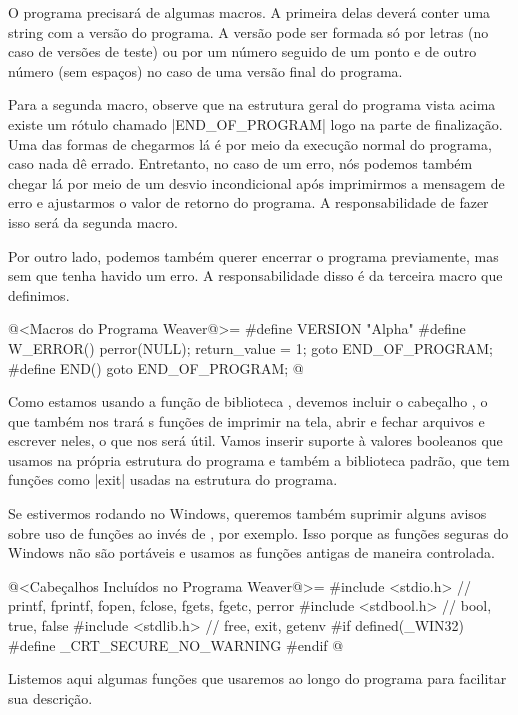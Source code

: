 
O programa precisará de algumas macros. A primeira delas deverá conter
uma string com a versão do programa. A versão pode ser formada só por
letras (no caso de versões de teste) ou por um número seguido de um
ponto e de outro número (sem espaços) no caso de uma versão final do
programa.

Para a segunda macro, observe que na estrutura geral do programa vista
acima existe um rótulo chamado |END_OF_PROGRAM| logo na parte de
finalização. Uma das formas de chegarmos lá é por meio da execução
normal do programa, caso nada dê errado. Entretanto, no caso de um
erro, nós podemos também chegar lá por meio de um desvio incondicional
após imprimirmos a mensagem de erro e ajustarmos o valor de retorno do
programa. A responsabilidade de fazer isso será da segunda macro.

Por outro lado, podemos também querer encerrar o programa previamente,
mas sem que tenha havido um erro. A responsabilidade disso é da
terceira macro que definimos.

\iniciocodigo
@<Macros do Programa Weaver@>=
#define VERSION "Alpha"
#define W_ERROR() {perror(NULL); return_value = 1; goto END_OF_PROGRAM;}
#define END() goto END_OF_PROGRAM;
@
\fimcodigo

Como estamos usando a função de biblioteca ,
devemos incluir o cabeçalho , o que também nos
trará s funções de imprimir na tela, abrir e fechar arquivos e
escrever neles, o que nos será útil. Vamos inserir suporte à valores
booleanos que usamos na própria estrutura do programa e também a
biblioteca padrão, que tem funções como |exit| usadas na estrutura do
programa.

Se estivermos rodando no Windows, queremos também suprimir alguns
avisos sobre uso de funções  ao invés
de , por exemplo. Isso porque as funções seguras
do Windows não são portáveis e usamos as funções antigas de maneira
controlada.

\iniciocodigo
@<Cabeçalhos Incluídos no Programa Weaver@>=
#include <stdio.h> // printf, fprintf, fopen, fclose, fgets, fgetc, perror
#include <stdbool.h> // bool, true, false
#include <stdlib.h> // free, exit, getenv
#if defined(_WIN32)
#define _CRT_SECURE_NO_WARNING
#endif
@
\fimcodigo


Listemos aqui algumas funções que usaremos ao longo do programa para
facilitar sua descrição.

